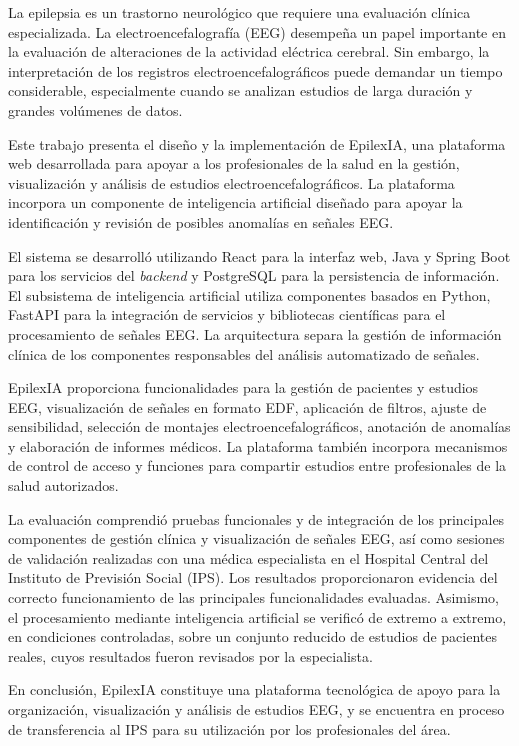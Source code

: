 
\begin{resumen}
\small

La epilepsia es un trastorno neurológico que requiere una
evaluación clínica especializada. La electroencefalografía
(EEG) desempeña un papel importante en la evaluación de
alteraciones de la actividad eléctrica cerebral. Sin
embargo, la interpretación de los registros
electroencefalográficos puede demandar un tiempo
considerable, especialmente cuando se analizan estudios
de larga duración y grandes volúmenes de datos.

Este trabajo presenta el diseño y la implementación de
EpilexIA, una plataforma web desarrollada para apoyar
a los profesionales de la salud en la gestión,
visualización y análisis de estudios
electroencefalográficos. La plataforma incorpora un
componente de inteligencia artificial diseñado para
apoyar la identificación y revisión de posibles
anomalías en señales EEG.

El sistema se desarrolló utilizando React para la
interfaz web, Java y Spring Boot para los servicios
del \textit{backend} y PostgreSQL para la persistencia
de información. El subsistema de inteligencia
artificial utiliza componentes basados en Python,
FastAPI para la integración de servicios y bibliotecas
científicas para el procesamiento de señales EEG.
La arquitectura separa la gestión de información
clínica de los componentes responsables del análisis
automatizado de señales.

EpilexIA proporciona funcionalidades para la gestión
de pacientes y estudios EEG, visualización de señales
en formato EDF, aplicación de filtros, ajuste
de sensibilidad, selección de montajes
electroencefalográficos, anotación de anomalías y
elaboración de informes médicos. La plataforma también
incorpora mecanismos de control de acceso y funciones
para compartir estudios entre profesionales de la
salud autorizados.

La evaluación comprendió pruebas funcionales y de
integración de los principales componentes de gestión
clínica y visualización de señales EEG, así como
sesiones de validación realizadas con una médica
especialista en el Hospital Central del Instituto
de Previsión Social (IPS). Los resultados
proporcionaron evidencia del correcto funcionamiento
de las principales funcionalidades evaluadas.
Asimismo, el procesamiento mediante inteligencia artificial se verificó de extremo a extremo, en condiciones controladas, sobre un conjunto reducido de estudios de pacientes reales, cuyos resultados fueron revisados por la especialista.

En conclusión, EpilexIA constituye una plataforma
tecnológica de apoyo para la organización,
visualización y análisis de estudios EEG, y se encuentra en proceso de transferencia al IPS para su utilización por los profesionales del área.

\end{resumen}
